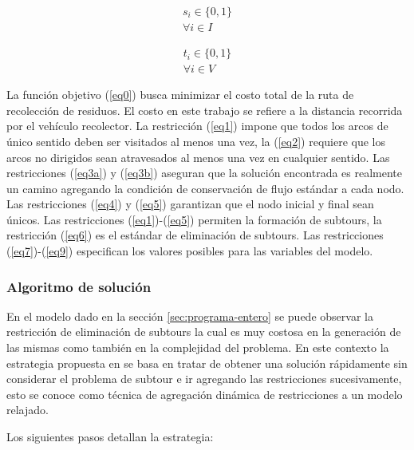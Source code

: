 \documentclass[conference,compsoc]{IEEEtran}
\begin{document}
\begin{equation} \tag{8} \label{eq8}
\begin{gathered}
    s_i \in \{0,1\} \\
    \forall i \in I
\end{gathered}
\end{equation}
\hbox{}

\begin{equation} \tag{9} \label{eq9}
\begin{gathered}
    t_i \in \{0,1\} \\
    \forall i \in V
\end{gathered}
\end{equation}

La función objetivo (\ref{eq0}) busca minimizar el costo total de la ruta de recolección de residuos. El costo en este trabajo se refiere a la distancia recorrida por el vehículo recolector. La restricción (\ref{eq1}) impone que todos los arcos de único sentido deben ser visitados al menos una vez, la (\ref{eq2}) requiere que los arcos no dirigidos sean atravesados al menos una vez en cualquier sentido. Las restricciones (\ref{eq3a}) y (\ref{eq3b}) aseguran que la solución encontrada es realmente un camino agregando la condición de conservación de flujo estándar a cada nodo. Las restricciones (\ref{eq4}) y (\ref{eq5}) garantizan que el nodo inicial y final sean únicos. Las restricciones (\ref{eq1})-(\ref{eq5}) permiten la formación de subtours, la restricción (\ref{eq6}) es el estándar de eliminación de subtours. Las restricciones (\ref{eq7})-(\ref{eq9}) especifican los valores posibles para las variables del modelo.

\subsubsection{Algoritmo de solución}
\label{algoritmo-solucion}
En el modelo dado en la sección \ref{sec:programa-entero} se puede observar la restricción de eliminación de subtours la cual es muy costosa en la generación de las mismas como también en  la complejidad del problema. En este contexto la estrategia propuesta en \cite{Braier2017AnArgentina} se basa en tratar de obtener una solución rápidamente sin considerar el problema de subtour e ir agregando las restricciones sucesivamente, esto se conoce como técnica de agregación dinámica de restricciones a un modelo relajado.

Los siguientes pasos detallan la estrategia:
\end{document}
